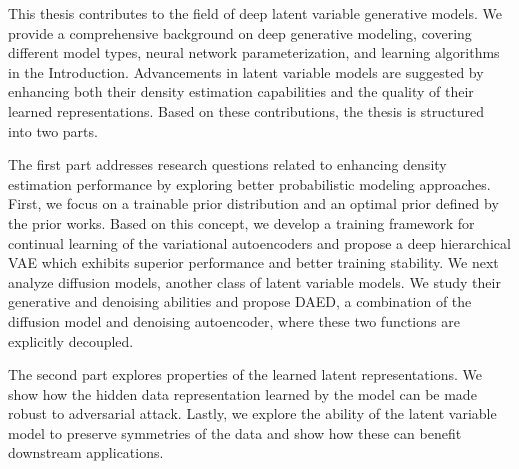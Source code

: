 \begin{abstractpage}

This thesis contributes to the field of deep latent variable generative models.
We provide a comprehensive background on deep generative modeling, covering different model types, neural network parameterization, and learning algorithms in the Introduction. 
Advancements in latent variable models are suggested by enhancing both their density estimation capabilities and the quality of their learned representations.
Based on these contributions, the thesis is structured into two parts. 

The first part addresses research questions related to enhancing density estimation performance by exploring better probabilistic modeling approaches. 
First, we focus on a trainable prior distribution and an optimal prior defined by the prior works. Based on this concept, we develop a training framework for continual learning of the variational autoencoders and propose a deep hierarchical VAE which exhibits superior performance and better training stability. We next analyze diffusion models, another class of latent variable models. We study their generative and denoising abilities and propose DAED, a combination of the diffusion model and denoising autoencoder, where these two functions are explicitly decoupled. 

The second part explores properties of the learned latent representations. We show how the hidden data representation learned by the model can be made robust to adversarial attack. Lastly, we explore the ability of the latent variable model to preserve symmetries of the data and show how these can benefit downstream applications.




\end{abstractpage}

